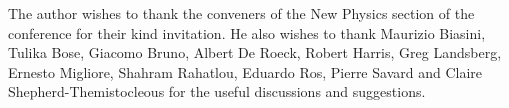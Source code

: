 \documentclass{cimento}
\begin{document}




\acknowledgments
The author wishes to thank the conveners of the New Physics 
section of the conference for their kind invitation. 
He also wishes to thank Maurizio Biasini, Tulika Bose, Giacomo Bruno, Albert De Roeck, Robert Harris, 
Greg Landsberg, Ernesto Migliore, Shahram Rahatlou, Eduardo Ros, Pierre Savard and Claire 
Shepherd-Themistocleous  for the useful discussions and suggestions.
\end{document}

